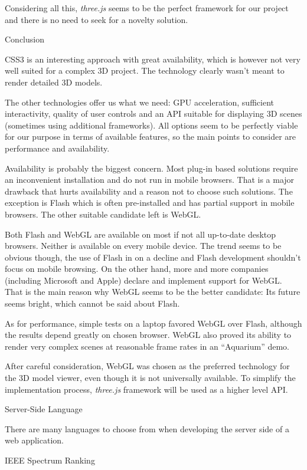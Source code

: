 Considering all this, {\it three.js} seems to be the perfect framework for our project and there is no need to seek for a novelty solution.

\secc Conclusion

CSS3 is an interesting approach with great availability, which is however not very well suited for a complex 3D project. The technology clearly wasn’t meant to render detailed 3D models.

The other technologies offer us what we need: GPU acceleration, sufficient interactivity, quality of user controls and an API suitable for displaying 3D scenes (sometimes using additional frameworks). All options seem to be perfectly viable for our purpose in terms of available features, so the main points to consider are performance and availability.

Availability is probably the biggest concern. Most plug-in based solutions require an inconvenient installation and do not run in mobile browsers. That is a major drawback that hurts availability and a reason not to choose such solutions. The exception is Flash which is often pre-installed and has partial support in mobile browsers. The other suitable candidate left is WebGL.

Both Flash and WebGL are available on most if not all up-to-date desktop browsers. Neither is available on every mobile device. The trend seems to be obvious though, the use of Flash in on a decline and Flash development shouldn’t focus on mobile browsing. On the other hand, more and more companies (including Microsoft and Apple) declare and implement support for WebGL. That is the main reason why WebGL seems to be the better candidate: Its future seems bright, which cannot be said about Flash.

As for performance, simple tests on a laptop favored WebGL over Flash, although the results depend greatly on chosen browser. WebGL also proved its ability to render very complex scenes at reasonable frame rates in an “Aquarium” demo.

After careful consideration, WebGL was chosen as the preferred technology for the 3D model viewer, even though it is not universally available. To simplify the implementation process, {\it three.js} framework will be used as a higher level API.

\sec Server-Side Language

There are many languages to choose from when developing the server side of a web application.

\secc IEEE Spectrum Ranking

